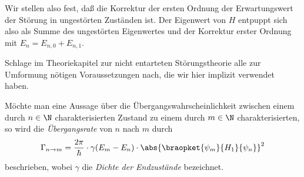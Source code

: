 \documentclass{subfiles}
\begin{document}
        Wir stellen also fest, daß die Korrektur der ersten Ordnung der Erwartungswert der Störung in ungestörten Zuständen ist. Der Eigenwert von $H$ entpuppt sich also als Summe des ungestörten Eigenwertes und der Korrektur erster Ordnung mit $E_n = E_{n,0} + E_{n,1}$.
        \begin{Aufgabe}
            \nr{} Schlage im Theoriekapitel zur nicht entarteten Störungstheorie alle zur Umformung nötigen Voraussetzungen nach, die wir hier implizit verwendet haben.
        \end{Aufgabe}
        Möchte man eine Aussage über die Übergangswahrscheinlichkeit zwischen einem durch $n\in\N$ charakterisierten Zustand zu einem durch $m\in\N$ charakterisierten, so wird die \emph{Übergangsrate} von $n$ nach $m$ durch
        \[
            \Gamma_{n\to m} = \frac{2\pi}{\hbar}\cdot\gamma(E_m - E_n)\cdot \abs{\braopket{\psi_m}{H_1}{\psi_n}}^2
        \]
        beschrieben, wobei $\gamma$ die \emph{Dichte der Endzustände} bezeichnet.
\end{document}
